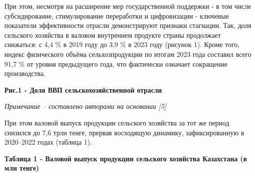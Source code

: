 При этом, несмотря на расширение мер государственной поддержки - в том
числе субсидирование, стимулирование переработки и цифровизации -
ключевые показатели эффективности отрасли демонстрируют признаки
стагнации. Так, доля сельского хозяйства в валовом внутреннем продукте
страны продолжает снижаться: с 4,4 \% в 2019 году до 3,9 \% в 2023 году
(рисунок 1). Кроме того, индекс физического объёма сельхозпродукции по
итогам 2023 года составил всего 91,7 \% от уровня предыдущего года, что
фактически означает сокращение производства.

{\bfseries Рис.1 - Доля ВВП сельскохозяйственной отрасли}

\emph{Примечание -- составлено авторами на основании {[}5{]}}

При этом валовой выпуск продукции сельского хозяйства за тот же период
снизился до 7,6 трлн тенге, прервав восходящую динамику, зафиксированную
в 2020--2022 годах (таблица 1).

{\bfseries Таблица 1 - Валовой выпуск продукции сельского хозяйства
Казахстана (в млн тенге)}

